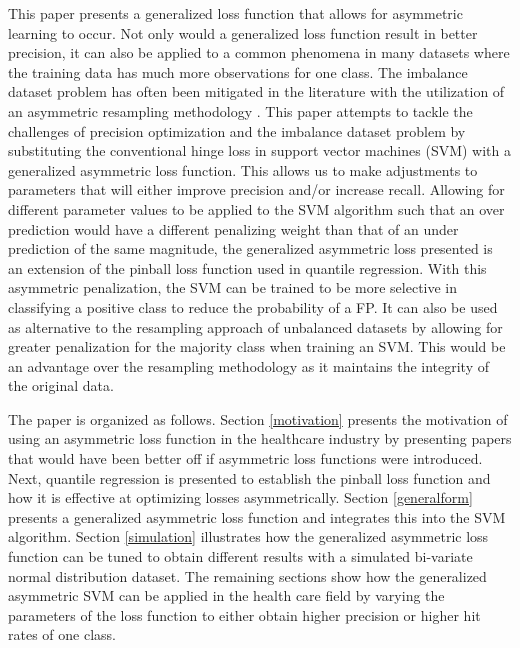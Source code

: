 \documentclass[twoside,11pt]{article}
\begin{document}
This paper presents a generalized loss function that allows for asymmetric learning to occur. Not only would a generalized loss function result in better precision, it can also be applied to a common phenomena in many datasets where the training data has much more observations for one class. The imbalance dataset problem has often been mitigated in the literature with the utilization of an asymmetric resampling methodology \citep{Hamed04}. This paper attempts to tackle the challenges of precision optimization and the imbalance dataset problem by substituting the conventional hinge loss in support vector machines (SVM) with a generalized asymmetric loss function. This allows us to make adjustments to parameters that will either improve precision and/or increase recall. Allowing for different parameter values to be applied to the SVM algorithm such that an over prediction would have a different penalizing weight than that of an under prediction of the same magnitude, the generalized asymmetric loss presented is an extension of the pinball loss function \citep{Steinwart07} used in quantile regression. With this asymmetric penalization, the SVM can be trained to be more selective in classifying a positive class to reduce the probability of a FP. It can also be used as alternative to the resampling approach of unbalanced datasets by allowing for greater penalization for the majority class when training an SVM. This would be an advantage over the resampling methodology as it maintains the integrity of the original data.

The paper is organized as follows. Section \ref{motivation} presents the motivation of using an asymmetric loss function in the healthcare industry by presenting papers that would have been better off if asymmetric loss functions were introduced. Next, quantile regression is presented to establish the pinball loss function and how it is effective at optimizing losses asymmetrically. Section \ref{generalform} presents a generalized asymmetric loss function and integrates this into the SVM algorithm. Section \ref{simulation} illustrates how the generalized asymmetric loss function can be tuned to obtain different results with a simulated bi-variate normal distribution dataset. The remaining sections show how the generalized asymmetric SVM can be applied in the health care field by varying the parameters of the loss function to either obtain higher precision or higher hit rates of one class.
\end{document}
